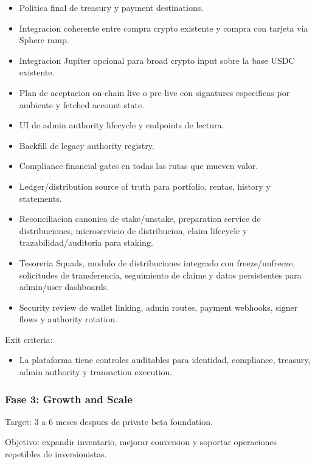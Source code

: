 \documentclass[
  10pt,
  letterpaper,
]{article}
\providecommand{\tightlist}{%
  \setlength{\itemsep}{0pt}\setlength{\parskip}{0pt}}
\begin{document}
\begin{itemize}
\tightlist
\item
  Politica final de treasury y payment destinations.
\item
  Integracion coherente entre compra crypto existente y compra con
  tarjeta via Sphere ramp.
\item
  Integracion Jupiter opcional para broad crypto input sobre la base
  USDC existente.
\item
  Plan de aceptacion on-chain live o pre-live con signatures especificas
  por ambiente y fetched account state.
\item
  UI de admin authority lifecycle y endpoints de lectura.
\item
  Backfill de legacy authority registry.
\item
  Compliance financial gates en todas las rutas que mueven valor.
\item
  Ledger/distribution source of truth para portfolio, rentas, history y
  statements.
\item
  Reconciliacion canonica de stake/unstake, preparation service de
  distribuciones, microservicio de distribucion, claim lifecycle y
  trazabilidad/auditoria para staking.
\item
  Tesoreria Squads, modulo de distribuciones integrado con
  freeze/unfreeze, solicitudes de transferencia, seguimiento de claims y
  datos persistentes para admin/user dashboards.
\item
  Security review de wallet linking, admin routes, payment webhooks,
  signer flows y authority rotation.
\end{itemize}

Exit criteria:

\begin{itemize}
\tightlist
\item
  La plataforma tiene controles auditables para identidad, compliance,
  treasury, admin authority y transaction execution.
\end{itemize}

\subsubsection{Fase 3: Growth and Scale}\label{fase-3-growth-and-scale}

Target: 3 a 6 meses despues de private beta foundation.

Objetivo: expandir inventario, mejorar conversion y soportar operaciones
repetibles de inversionistas.
\end{document}
